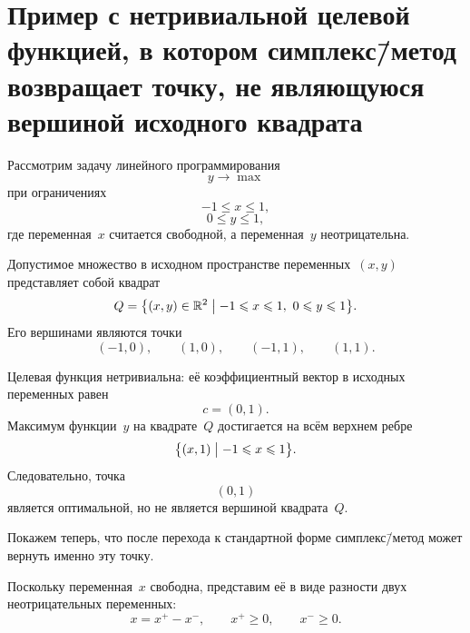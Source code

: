 \section{\texorpdfstring{Пример с нетривиальной целевой функцией, в котором симплекс\=/метод возвращает точку, не являющуюся вершиной исходного квадрата}{Пример с нетривиальной целевой функцией, в котором симплекс-метод возвращает точку, не являющуюся вершиной исходного квадрата}}

Рассмотрим задачу линейного программирования
\begin{equation*}
  y \to \max
\end{equation*}
при ограничениях
\begin{equation*}
  -1 \leqslant x \leqslant 1,
\end{equation*}
\begin{equation*}
  0 \leqslant y \leqslant 1,
\end{equation*}
где переменная~$x$ считается свободной, а переменная~$y$ неотрицательна.

Допустимое множество в исходном пространстве переменных~$(x, y)$ представляет собой квадрат
\begin{equation*}
  Q = \big\{ (x, y) \in \mathbb{R}^2 \bigm| -1 \leqslant x \leqslant 1,\ 0 \leqslant y \leqslant 1 \big\}.
\end{equation*}
Его вершинами являются точки
\begin{equation*}
  (-1, 0), \qquad (1, 0), \qquad (-1, 1), \qquad (1, 1).
\end{equation*}

Целевая функция нетривиальна: её коэффициентный вектор в исходных переменных равен
\begin{equation*}
  c = (0, 1).
\end{equation*}
Максимум функции~$y$ на квадрате~$Q$ достигается на всём верхнем ребре
\begin{equation*}
  \big\{ (x, 1) \bigm| -1 \leqslant x \leqslant 1 \big\}.
\end{equation*}
Следовательно, точка
\begin{equation*}
  (0, 1)
\end{equation*}
является оптимальной, но не является вершиной квадрата~$Q$.

Покажем теперь, что после перехода к стандартной форме симплекс\=/метод может вернуть именно эту точку.

Поскольку переменная~$x$ свободна, представим её в виде разности двух неотрицательных переменных:
\begin{equation*}
  x = x^+ - x^-,
  \qquad
  x^+ \geqslant 0,
  \qquad
  x^- \geqslant 0.
\end{equation*}

